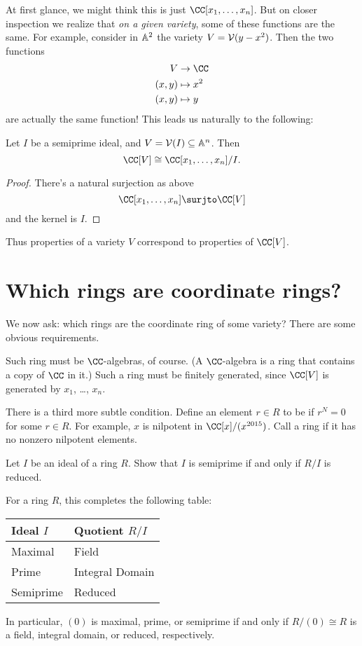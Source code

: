 \documentclass[11pt]{scrreprt}
\begin{document}
At first glance, we might think this is just $\CC[x_1, \dots, x_n]$.
But on closer inspection we realize that \emph{on a given variety},
some of these functions are the same.
For example, consider in $\mathbb A^2$ the variety $V = \mathcal V(y-x^2)$.
Then the two functions
\begin{align*}
	V & \to \CC \\
	(x,y) & \mapsto x^2 \\
	(x,y) & \mapsto y
\end{align*}
are actually the same function!
This leads us naturally to the following:
\begin{theorem}
	Let $I$ be a semiprime ideal, and $V = \mathcal V(I) \subseteq \mathbb A^n$.
	Then
	\[
		\CC[V] \cong \CC[x_1, \dots, x_n] / I.
	\]
\end{theorem}
\begin{proof}
	There's a natural surjection as above
	\[ \CC[x_1, \dots, x_n] \surjto \CC[V] \]
	and the kernel is $I$.
\end{proof}

Thus properties of a variety $V$ correspond to properties of $\CC[V]$.

\section{Which rings are coordinate rings?}
We now ask: which rings are the coordinate ring of some variety?
There are some obvious requirements.
\begin{itemize}
	\ii Such ring must be $\CC$-algebras, of course.
	(A $\CC$-algebra is a ring that contains a copy of $\CC$ in it.)
	\ii Such a ring must be finitely generated, since $\CC[V]$
	is generated by $x_1$, \dots, $x_n$.
\end{itemize}
There is a third more subtle condition.
Define an element $r \in R$ to be  if $r^N = 0$ for some $r \in R$.
For example, $x$ is nilpotent in $\CC[x]/(x^{2015})$.
Call a ring  if it has no nonzero nilpotent elements.

\begin{exercise}
	Let $I$ be an ideal of a ring $R$.
	Show that $I$ is semiprime if and only if $R/I$ is reduced.
\end{exercise}
\begin{remark}
	For a ring $R$, this completes the following table:
	\begin{center}
	\begin{tabular}[h]{l|l}
		Ideal $I$ & Quotient $R/I$ \\ \hline
		Maximal & Field \\
		Prime & Integral Domain \\
		Semiprime & Reduced
	\end{tabular}
	\end{center}
	In particular, $(0)$ is maximal, prime, or semiprime
	if and only if $R/(0) \cong R$ is a field, integral domain, or reduced, respectively.
\end{remark}
\end{document}
